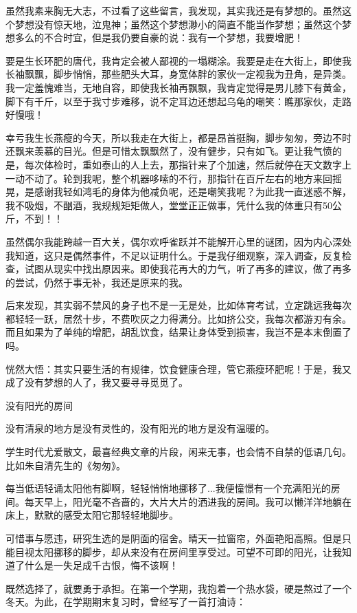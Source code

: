 虽然我素来胸无大志，不过看了这些留言，我发现，其实我还是有梦想的。虽然这个梦想没有惊天地，泣鬼神；虽然这个梦想渺小的简直不能当作梦想；虽然这个梦想多么的不合时宜，但是我仍要自豪的说：我有一个梦想，我要增肥！

要是生长环肥的唐代，我肯定会被人鄙视的一塌糊涂。我要是走在大街上，即使我长袖飘飘，脚步悄悄，那些肥头大耳，身宽体胖的家伙一定视我为丑角，是异类。 我一定羞愧难当，无地自容，即使我长袖再飘飘，我肯定觉得是男儿膝下有黄金，脚下有千斤，以至于我寸步难移，说不定耳边还想起乌龟的嘲笑：瞧那家伙，走路好慢哦！

幸亏我生长燕瘦的今天，所以我走在大街上，都是昂首挺胸，脚步匆匆，旁边不时还飘来羡慕的目光。但是可惜太飘飘然了，没有健步，只有如飞。更让我气愤的是，每次体检时，重如泰山的人上去，那指针来了个加速，然后就停在天文数字上一动不动了。轮到我呢，整个机器哆嗦的不行，那指针在百斤左右的地方来回摇晃，是感谢我轻如鸿毛的身体为他减负呢，还是嘲笑我呢？为此我一直迷惑不解，我不吸烟，不酗酒，我规规矩矩做人，堂堂正正做事，凭什么我的体重只有50公斤，不到！！

虽然偶尔我能跨越一百大关，偶尔欢呼雀跃并不能解开心里的谜团，因为内心深处我知道，这只是偶然事件，不足以证明什么。于是我仔细观察，深入调查，反复检查，试图从现实中找出原因来。即使我花再大的力气，听了再多的建议，做了再多的尝试，仍然于事无补，我还是原来的我。

后来发现，其实弱不禁风的身子也不是一无是处，比如体育考试，立定跳远我每次都轻轻一跃，居然十步，不费吹灰之力得满分。比如挤公交，我每次都游刃有余。而且如果为了单纯的增肥，胡乱饮食，结果让身体受到损害，我岂不是本末倒置了吗。

恍然大悟：其实只要生活的有规律，饮食健康合理，管它燕瘦环肥呢！于是，我又成了没有梦想的人了，我又要寻寻觅觅了。


没有阳光的房间

没有清泉的地方是没有灵性的，没有阳光的地方是没有温暖的。

学生时代尤爱散文，最喜经典文章的片段，闲来无事，也会情不自禁的低语几句。比如朱自清先生的《匆匆》。

每当低语轻诵太阳他有脚啊，轻轻悄悄地挪移了...我便憧憬有一个充满阳光的房间。每天早上，阳光毫不吝啬的，大片大片的洒进我的房间。我可以懒洋洋地躺在床上，默默的感受太阳它那轻轻地脚步。

可惜事与愿违，研究生选的是阴面的宿舍。晴天一拉窗帘，外面艳阳高照。但是只能目视太阳挪移的脚步，却从来没有在房间里享受过。可望不可即的阳光，让我知道了什么是一失足成千古恨，悔不该啊！

既然选择了，就要勇于承担。在第一个学期，我抱着一个热水袋，硬是熬过了一个冬天。为此，在学期期末复习时，曾经写了一首打油诗：


